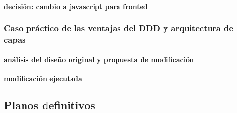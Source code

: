         \paragraph{decisión: cambio a javascript para fronted}
    \subsubsection{Caso práctico de las ventajas del DDD y arquitectura de capas}
        \paragraph{análisis del diseño original y propuesta de modificación}
        \paragraph{modificación ejecutada}

\subsection{Planos definitivos}\label{subsec:planos definitivos}

